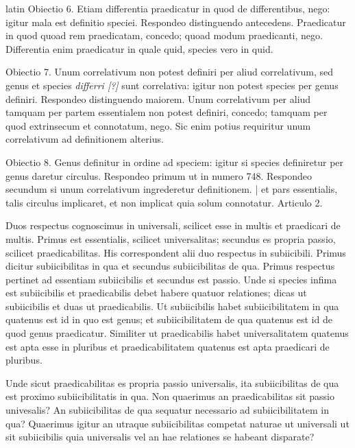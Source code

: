 \begin{otherlanguage*}{latin}
\pstart
 Obiectio 6. Etiam differentia praedicatur in quod de differentibus, nego: igitur mala est definitio speciei. Respondeo distinguendo antecedens. Praedicatur in quod quoad rem praedicatam, concedo; quoad modum praedicanti, nego. Differentia enim praedicatur in quale quid, species vero in quid. 
\pend

\pstart
 Obiectio 7. Unum correlativum non potest definiri per aliud correlativum, sed genus et species \emph{differri [?]} sunt correlativa: igitur non potest species per genus definiri. Respondeo distinguendo maiorem. Unum correlativum per aliud tamquam per partem essentialem non potest definiri, concedo; tamquam per quod extrinsecum et connotatum, nego. Sic enim potius requiritur unum correlativum ad definitionem alterius. 
\pend

\pstart
 Obiectio 8. Genus definitur in ordine ad speciem: igitur si species definiretur per genus daretur circulus. Respondeo primum ut in numero 748. Respondeo secundum si unum correlativum ingrederetur definitionem. \textnormal{|} et pars essentialis, talis circulus implicaret, et non implicat quia solum connotatur. Articulo 2. 
\pend

        \pstart
        \pend
      
\pstart
 Duos respectus cognoscimus in universali, scilicet esse in multis et praedicari de multis. Primus est essentialis, scilicet universalitas; secundus es propria passio, scilicet praedicabilitas. His correspondent alii duo respectus in subiicibili. Primus dicitur subiicibilitas in qua et secundus subiicibilitas de qua. Primus respectus pertinet ad essentiam subiicibilis et secundus est passio. Unde si species infima est subiicibilis et praedicabilis debet habere quatuor relationes; dicas ut subiicibilis et duas ut praedicabilis. Ut subiicibilis habet subiicibilitatem in qua quatenus est id in quo est genus; et subiicibilitatem de qua quatenus est id de quod genus praedicatur. Similiter ut praedicabilis habet universalitatem quatenus est apta esse in pluribus et praedicabilitatem quatenus est apta praedicari de pluribus. 
\pend

\pstart
 Unde sicut praedicabilitas es propria passio universalis, ita subiicibilitas de qua est proximo subiicibilitatis in qua. Non quaerimus an praedicabilitas sit passio univesalis? An subiicibilitas de qua sequatur necessario ad subiicibilitatem in qua? Quaerimus igitur an utraque subiicibilitas competat naturae ut universali ut sit subiicibilis quia universalis vel an hae relationes se habeant disparate? 
\pend


\end{otherlanguage*}
